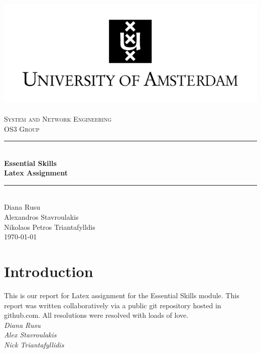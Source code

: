 \documentclass[a4paper,11pt]{report}
\newcommand{\HRule}{\rule{\linewidth}{0.5mm}}
\begin{document}
\begin{titlepage}

\begin{center}

\includegraphics{images/UvA-logo-2a.png}~\\[1cm]

\textsc{\LARGE System and Network Engineering\\ OS3 Group}\\[1.5cm]

\HRule \\

{ \huge \bfseries Essential Skills\\Latex Assignment}

\HRule \\[1cm]

\large{Diana Rusu} \\
\large{Alexandros Stavroulakis}\\
\large{Nikolaos Petros Triantafylldis}\\[11cm]

\today
\end{center}
\end{titlepage}

\tableofcontents

\listoffigures

\listoftables

\chapter* {Introduction}

This is our report for Latex assignment for the Essential Skills module. This report was written collaboratively via a public git repository hosted in github.com. All resolutions were resolved with loads of love. \\[0.5 cm]
\emph{Diana Rusu}\\
\emph{Alex Stavroulakis}\\
\emph{Nick Triantafyllidis}\\
\end{document}
